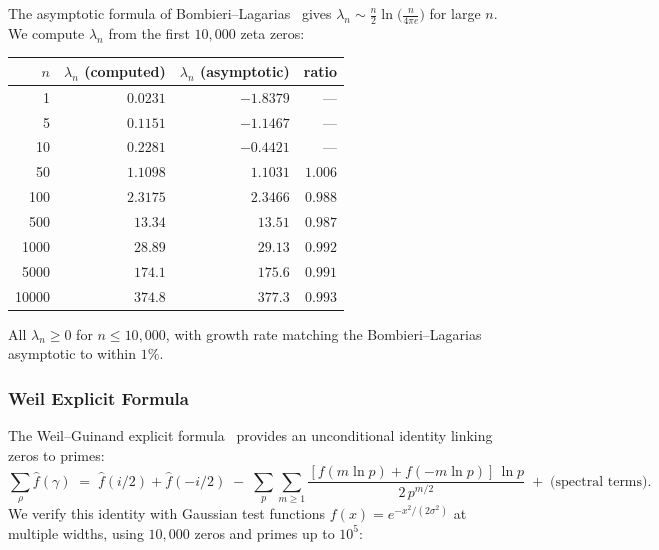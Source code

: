 \documentclass[11pt,a4paper]{article}
\theoremstyle{plain}
\theoremstyle{remark}
\begin{document}
\noindent The asymptotic formula of Bombieri--Lagarias~\cite{bombieri-lagarias1999}
gives $\lambda_n \sim \tfrac{n}{2}\ln\!\bigl(\tfrac{n}{4\pi e}\bigr)$
for large $n$.  We compute $\lambda_n$ from the first $10{,}000$ zeta
zeros:

\begin{center}\small
\begin{tabular}{@{}rrrr@{}}
\toprule
$n$ & $\lambda_n$ (computed) & $\lambda_n$ (asymptotic) & ratio\\
\midrule
1   & $0.0231$ & $-1.8379$ & ---\\
5   & $0.1151$ & $-1.1467$ & ---\\
10  & $0.2281$ & $-0.4421$ & ---\\
50  & $1.1098$ & $1.1031$ & $1.006$\\
100 & $2.3175$ & $2.3466$ & $0.988$\\
500 & $13.34$  & $13.51$  & $0.987$\\
1000& $28.89$ & $29.13$  & $0.992$\\
5000& $174.1$ & $175.6$  & $0.991$\\
10000& $374.8$ & $377.3$ & $0.993$\\
\bottomrule
\end{tabular}
\end{center}

\noindent All $\lambda_n \geq 0$ for $n\leq 10{,}000$, with growth rate
matching the Bombieri--Lagarias asymptotic to within $1\%$.

\subsubsection{Weil Explicit Formula}
\label{sec:weil-explicit}

The Weil--Guinand explicit formula~\cite{weil1952,guinand1947}
provides an unconditional identity linking zeros to primes:
\[
  \sum_\rho \hat f(\gamma) \;=\; \hat f(i/2) + \hat f(-i/2)
  \;-\; \sum_p\sum_{m\geq 1} \frac{[f(m\ln p)+f(-m\ln p)]\,\ln p}
         {2\,p^{m/2}}
  \;+\; \text{(spectral terms)}.
\]
We verify this identity with Gaussian test functions
$f(x) = e^{-x^2/(2\sigma^2)}$ at multiple widths, using $10{,}000$
zeros and primes up to $10^5$:
\end{document}
